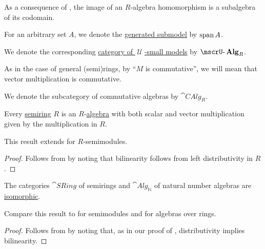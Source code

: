 \begin{definition}
\begin{thmenum}
    As a consequence of , the image of an \( R \)-algebra homomorphism is a subalgebra of its codomain.

     For an arbitrary set \( A \), we denote the \hyperref[def:first_order_generated_substructure]{generated submodel} by \( \operatorname{span}{ A } \).

     We denote the corresponding \hyperref[def:category_of_small_first_order_models]{category of \( \mscrU \)-small models} by \( \ucat{Alg}_R \).

     As in the case of general (semi)rings, by \enquote{\( M \) is commutative}, we will mean that vector multiplication is commutative.

    We denote the subcategory of commutative algebras by \( \cat{CAlg}_R \).
  \end{thmenum}
\end{definition}

\begin{proposition}\label{thm:semiring_is_algebra}
  Every \hyperref[def:semiring]{semiring} \( R \) is an \( R \)-\hyperref[def:algebra_over_semiring]{algebra} with both scalar and vector multiplication given by the multiplication in \( R \).
\end{proposition}
\begin{comments}
  \item This result extends  for \( R \)-semimodules.
\end{comments}
\begin{proof}
  Follows from  by noting that bilinearity follows from left distributivity in \( R \).
\end{proof}

\begin{proposition}\label{thm:semiring_is_natural_number_algebra}
  The categories \( \hyperref[def:semiring/category]{\cat{SRing}} \) of semirings and \( \hyperref[def:algebra_over_semiring/category]{\cat{Alg}_\BbbN} \) of natural number algebras are \hyperref[rem:category_similarity/isomorphism]{isomorphic}.
\end{proposition}
\begin{comments}
  \item Compare this result to  for semimodules and  for algebras over rings.
\end{comments}
\begin{proof}
  Follows from  by noting that, as in our proof of , distributivity implies bilinearity.
\end{proof}


